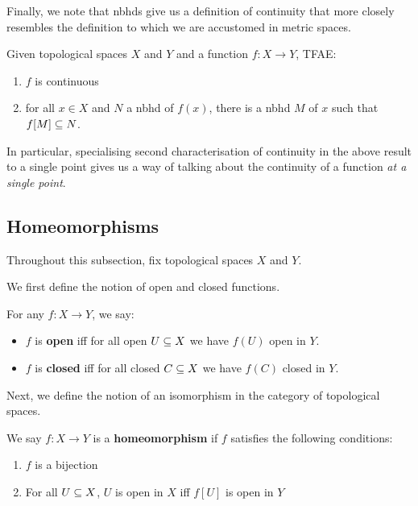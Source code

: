 Finally, we note that nbhds give us a definition of continuity that more closely resembles the definition to which we are accustomed in metric spaces.

\begin{boxproposition}
    Given topological spaces $X$ and $Y$ and a function $f : X \to Y$, TFAE:
    \begin{enumerate}
        \item $f$ is continuous
        \item for all $x \in X$ and $N$ a nbhd of $f(x)$, there is a nbhd $M$ of $x$ such that $f[M] \subseteq N$.
    \end{enumerate}
\end{boxproposition}

In particular, specialising second characterisation of continuity in the above result to a single point gives us a way of talking about the continuity of a function \textit{at a single point}.

\subsection{Homeomorphisms}

Throughout this subsection, fix topological spaces $X$ and $Y$.

We first define the notion of open and closed functions.

\begin{boxdefinition}
    For any $f : X \to Y$, we say:
    \begin{itemize}
        \item $f$ is \textbf{open} iff for all open $U\subseteq X$ we have $f(U)$ open in $Y$.
        \item $f$ is \textbf{closed} iff for all closed $C\subseteq X$ we have $f(C)$ closed in $Y$.
    \end{itemize}
\end{boxdefinition}

Next, we define the notion of an isomorphism in the category of topological spaces.

\begin{boxdefinition}[Homeomorphism]
    We say $f : X \to Y$ is a \textbf{homeomorphism} if $f$ satisfies the following conditions:
    \begin{enumerate}
        \item $f$ is a bijection
        \item For all $U \subseteq X$, $U$ is open in $X$ iff $f[U]$ is open in $Y$
    \end{enumerate}
\end{boxdefinition}

